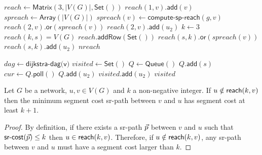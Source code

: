 \begin{algorithm}[t]
\small
\caption{$\textsf{compute-reach}\left( g \right)$}
\begin{algorithmic}[1]
\STATE $reach \gets \textsf{Matrix}(3, |V(G)|, \textsf{Set}())$
  \STATE $reach(1, v).\textsf{add}(v)$
\ENDFOR
\STATE $spreach \gets \textsf{Array}(|V(G)|)$
  \STATE $spreach(v) \gets \textsf{compute-sp-reach}(g, v)$
  \STATE $reach(2, v).\textsf{or}(spreach(v))$
    \STATE $reach(2, v).\textsf{add}(u_2)$
  \ENDFOR
\ENDFOR
\STATE $k \gets 3$
      \STATE $reach(k, s) = V(G)$
    \ELSE
      \STATE $reach.\textsf{addRow}(\textsf{Set}())$
        \STATE $reach(s, k).\textsf{or}(spreach(v))$
      \ENDFOR
	  \STATE $reach(s, k).\textsf{add}(u_2)$
        \ENDFOR
      \ENDFOR
    \ENDIF
  \ENDFOR
\ENDWHILE
\RETURN $nreach$
\end{algorithmic}
\label{algo:nreach}
\end{algorithm}

\begin{algorithm}[t]
\small
\caption{$\textsf{compute-sp-reach}\left( g, s \right)$}
\begin{algorithmic}[1]
\STATE $dag \gets \textsf{dijkstra-dag(v)}$
\STATE $visited \gets \textsf{Set}()$
\STATE $Q \gets \textsf{Queue}()$
\STATE $Q.\textsf{add}(s)$
  \STATE $cur \gets Q.\textsf{poll}()$
   \label{algo:spreach_if}
    \STATE $Q.\textsf{add}(u_2)$
    \STATE $visited.\textsf{add}(u_2)$
  \ENDFOR
\ENDWHILE
\RETURN $visited$
\end{algorithmic}
\label{algo:spreach}
\end{algorithm}

\begin{lemma}
\label{lemma:reachminseg}
Let $G$ be a network, $u, v \in V(G)$ and $k$ a non-negative integer. If $u \notin \textsf{reach}(k, v)$ then the minimum segment cost sr-path
between $v$ and $u$ has segment cost at least $k + 1$.
\end{lemma}

\begin{proof}
By definition, if there exists a sr-path $\vec{p}$ between $v$ and $u$ such that $\textsf{sr-cost}(\vec{p}) \leq k$ then
$u  \in \textsf{reach}(k, v)$. Therefore, if $u \notin \textsf{reach}(k, v)$, any sr-path between $v$ and $u$ must have a segment cost larger than $k$.
\end{proof}

